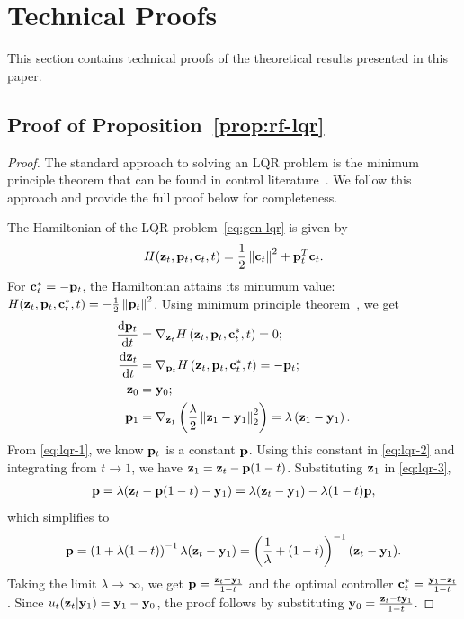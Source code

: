 \documentclass{article} %
\theoremstyle{plain}
\newcommand{\deriv}{\mathrm{d}}
\begin{document}
\section{Technical Proofs}
\label{sec:proofs}
This section contains technical proofs of the theoretical results presented in this paper.
\subsection{Proof of Proposition~\ref{prop:rf-lqr}}
\label{sec:proofs-prop-rf-lqr}
\begin{proof}
The standard approach to solving an LQR problem is the minimum principle theorem that can be found in control literature~\citep{fleming2012deterministic,basar2020lecture}. We follow this approach and provide the full proof below for completeness.

The Hamiltonian of the LQR problem~\eqref{eq:gen-lqr} is given by
\begin{align}
    H({\mathbf{z}}_t, {\mathbf{p}}_t, {\mathbf{c}}_t, t) = \frac{1}{2}\left\|{\mathbf{c}}_t\right\|^2 + {\mathbf{p}}_t^T{\mathbf{c}}_t.
\end{align}
For ${\mathbf{c}}_t^* = -{\mathbf{p}}_t$, the Hamiltonian attains its minumum value: $H({\mathbf{z}}_t, {\mathbf{p}}_t, {\mathbf{c}}_t^*, t) = -\frac{1}{2}\left\|{\mathbf{p}}_t \right\|^2$.
Using minimum principle theorem~\citep{fleming2012deterministic,basar2020lecture}, we get
\begin{align}
\label{eq:lqr-1}
\frac{\deriv \rvp_t}{\deriv t} 
    &= \nabla_{\rvz_t} H\left(\rvz_t, \rvp_t, \rvc_t^*, t\right) = 0;\\
    \label{eq:lqr-2}
    \frac{\deriv \rvz_t}{\deriv t} 
    &= \nabla_{\rvp_t} H\left(\rvz_t, \rvp_t, \rvc_t^*, t\right) = -\rvp_t;\\
    \label{eq:lqr-3}
    \rvz_0 &= \rvy_0;\\
    \label{eq:lqr-4}
    \rvp_1 &= \nabla_{\rvz_1}  \left( \frac{\lambda}{2} \left\|\rvz_1 - \rvy_1\right\|_2^2\right) = \lambda \left(\rvz_1 - \rvy_1 \right).
\end{align}
From \eqref{eq:lqr-1}, we know ${\mathbf{p}}_t$ is a constant ${\mathbf{p}}$. 
Using this constant in \eqref{eq:lqr-2} and integrating from $t\rightarrow1$, we have ${\mathbf{z}}_1 = {\mathbf{z}}_t - {\mathbf{p}} (1-t)$.
Substituting ${\mathbf{z}}_1$ in \eqref{eq:lqr-3}, 
\begin{align*}
    {\mathbf{p}} = \lambda ({\mathbf{z}}_t - {\mathbf{p}}(1-t)-{\mathbf{y}}_1) = \lambda ({\mathbf{z}}_t - {\mathbf{y}}_1) - \lambda (1-t){\mathbf{p}},
\end{align*}
which simplifies to 
\begin{align*}
    {\mathbf{p}} = \left(1+\lambda (1-t)\right)^{-1} \lambda ({\mathbf{z}}_t - {\mathbf{y}}_1)
    = \left(\frac{1}{\lambda}+(1-t)\right)^{-1} ({\mathbf{z}}_t - {\mathbf{y}}_1).
\end{align*}
Taking the limit $\lambda \rightarrow \infty$, we get ${\mathbf{p}} = \frac{{\mathbf{z}}_t - {\mathbf{y}}_1}{1-t}$ and the optimal controller ${\mathbf{c}}_t^* = \frac{{\mathbf{y}}_1 - {\mathbf{z}}_t}{1-t}$. Since $u_t({\mathbf{z}}_t | {\mathbf{y}}_1) = {\mathbf{y}}_1 - {\mathbf{y}}_0$, the proof follows by substituting ${\mathbf{y}}_0 = \frac{{\mathbf{z}}_t - t{\mathbf{y}}_1}{1-t}$. 
\end{proof}
\end{document}

